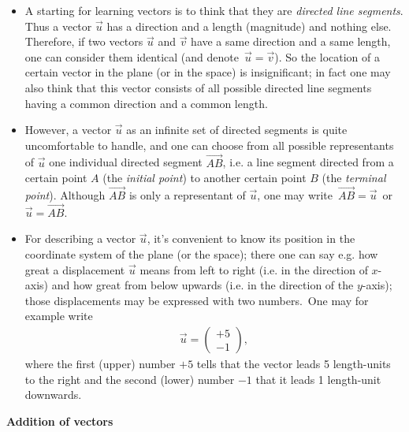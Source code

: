 \documentclass[12pt]{article}
\theoremstyle{definition}
\begin{document}
 

\begin{itemize}
\item A starting  for learning vectors is to think that they are {\em directed line segments}.  Thus a vector $\vec{u}$ has a direction and a length (magnitude) and nothing else.  Therefore, if two vectors $\vec{u}$ and $\vec{v}$ have a same direction and a same length, one can consider them identical (and denote\, $\vec{u} = \vec{v}$).  So the location of a certain vector in the plane (or in the space) is insignificant; in fact one may also think that this vector consists of all possible directed line segments having a common direction and a common length.

\item However, a vector $\vec{u}$ as an infinite set of directed segments is quite uncomfortable to handle, and one can choose from all possible representants of $\vec{u}$ one individual directed segment $\overrightarrow{AB}$, i.e. a line segment directed from a certain point $A$ (the {\em initial point}) to another certain point $B$ (the {\em terminal point}).  Although $\overrightarrow{AB}$ is only a representant of $\vec{u}$, one may write\, $\overrightarrow{AB} = \vec{u}$\, or\, $\vec{u} = \overrightarrow{AB}$.

\item For describing a vector $\vec{u}$, it's convenient to know its position in the coordinate system of the plane (or the space); there one can say e.g. how great a displacement $\vec{u}$ means from left to right (i.e. in the direction of $x$-axis) and how great from below upwards (i.e. in the direction of the $y$-axis); those displacements may be expressed with two numbers.\, One may for example write
\begin{align}
\vec{u} = \left(\!\begin{array}{c} +5\\-1 \end{array}\!\right)\!,
\end{align}
where the first (upper) number $+5$ tells that the vector leads 5 length-units to the right and the second (lower) number $-1$ that it leads 1 length-unit downwards.\\

\end{itemize}

\textbf{Addition of vectors}
\end{document}
